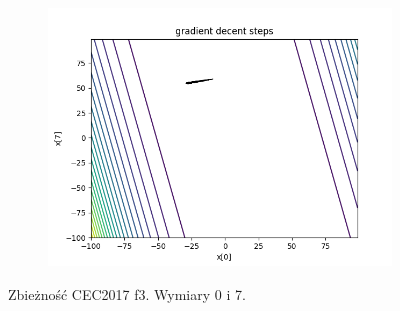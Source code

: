 \begin{figure}[h!]
\begin{subfigure}[b]{0.45\linewidth}
			\includegraphics[width=\linewidth]{photos/f3_3_1.png}
		\end{subfigure}
		\caption{Zbieżność CEC2017 f3. Wymiary 0 i 7.}
	\end{figure}
	\newpage
